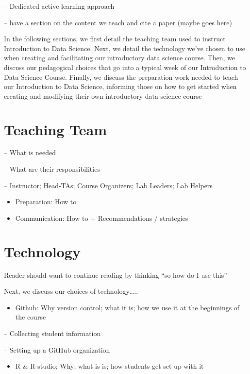 \documentclass[
  12pt]{article}
\providecommand{\tightlist}{%
  \setlength{\itemsep}{0pt}\setlength{\parskip}{0pt}}\usepackage{longtable,booktabs,array}
\begin{document}
-- Dedicated active learning approach

-- have a section on the content we teach and cite a paper (maybe goes
here)

In the following sections, we first detail the teaching team used to
instruct Introduction to Data Science. Next, we detail the technology
we've chosen to use when creating and facilitating our introductory data
science course. Then, we discuss our pedagogical choices that go into a
typical week of our Introduction to Data Science Course. Finally, we
discuss the preparation work needed to teach our Introduction to Data
Science, informing those on how to get started when creating and
modifying their own introductory data science course

\hypertarget{teaching-team}{%
\section{Teaching Team}\label{teaching-team}}

-- What is needed

-- What are their responsibilities

-- Instructor; Head-TAs; Course Organizers; Lab Leaders; Lab Helpers

\begin{itemize}
\item
  Preparation: How to
\item
  Communication: How to + Recommendations / strategies
\end{itemize}

\hypertarget{sec-tech}{%
\section{Technology}\label{sec-tech}}

Reader should want to continue reading by thinking ``so how do I use
this''

Next, we discuss our choices of technology\ldots..

\begin{itemize}
\tightlist
\item
  Github: Why version control; what it is; how we use it at the
  beginnings of the course
\end{itemize}

-- Collecting student information

-- Setting up a GitHub organization

\begin{itemize}
\tightlist
\item
  R \& R-studio; Why; what is is; how students get set up with it
\end{itemize}
\end{document}
